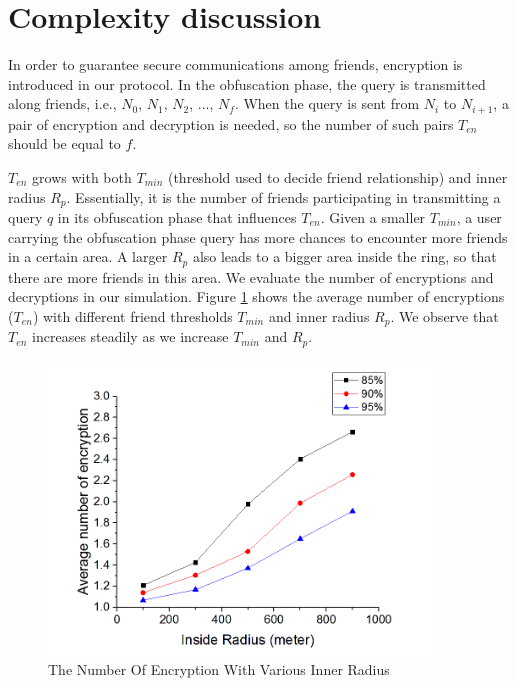 \section{ Complexity discussion}

\noindent In order to guarantee secure communications among friends, encryption is introduced in our protocol. In the obfuscation phase, the query is transmitted along friends, i.e., ${N}_{0}$, ${N}_{1}$, ${N}_{2}$, ..., ${N}_{f}$. When the query is sent from ${N}_{i}$ to ${N}_{i+1}$, a pair of encryption and decryption is needed, so the number of such pairs $T_{en}$ should be equal to $f$. 

$T_{en}$ grows with both ${T}_{min}$ (threshold used to decide friend relationship) and inner radius ${R}_{p}$. Essentially, it is the number of friends participating in transmitting a query $q$ in its obfuscation phase that influences $T_{en}$. Given a smaller ${T}_{min}$, a user carrying the obfuscation phase query has more chances to encounter more friends in a certain area. A larger ${R}_{p}$ also leads to a bigger area inside the ring, so that there are more friends in this area. We evaluate the number of encryptions and decryptions in our simulation. Figure \ref{fig:NumOfEncWithInnerR} shows the average number of encryptions ($T_{en}$) with different friend thresholds ${T}_{min}$ and inner radius ${R}_{p}$. We observe that $T_{en}$ increases steadily as we increase ${T}_{min}$ and ${R}_{p}$.

\begin{figure} [H]
  \centering 
  \includegraphics[width=4.0in]{figures/NumOfEncWithInnerR.png}
  \caption{The Number Of Encryption With Various Inner Radius} 
  \label{fig:NumOfEncWithInnerR} %
\end{figure}

